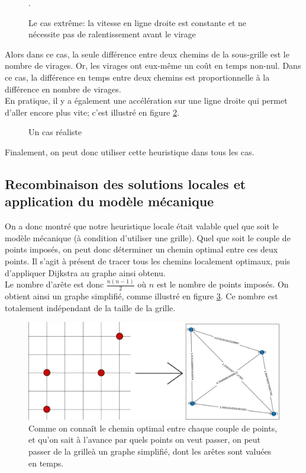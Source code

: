\begin{figure}
	\centering
	{\small }
	\caption{Le cas extrême: la vitesse en ligne droite est constante et ne nécessite pas de ralentissement avant le virage}.
	\label{fig:grille6}
\end{figure}
Alors dans ce cas, la seule différence entre deux chemins de la sous-grille est le nombre de virages. Or, les virages ont eux-même un coût en temps non-nul. Dans ce cas, la différence en temps entre deux chemins est proportionnelle à la différence en nombre de virages.\\
En pratique, il y a également une accélération sur une ligne droite qui permet d'aller encore plus vite; c'est illustré en figure \ref{fig:grille7}.
\begin{figure}
	\centering
	{\small	}
	\caption{Un cas réaliste}
	\label{fig:grille7}
\end{figure}
Finalement, on peut donc utiliser cette heuristique dans tous les cas.
\subsection{Recombinaison des solutions locales et application du modèle mécanique}
On a donc montré que notre heuristique locale était valable quel que soit le modèle mécanique (à condition d'utiliser une grille). Quel que soit le couple de  points imposés, on peut donc déterminer un chemin optimal entre ces deux points. Il s'agit à présent de tracer tous les chemins localement optimaux, puis d'appliquer Dijkstra au graphe ainsi obtenu.\\
Le nombre d'arête est donc $\frac{n(n-1)}{2}$ où $n$ est le nombre de points imposés. On obtient ainsi un graphe simplifié, comme illustré en figure \ref{fig:grapheSimp}. Ce nombre est totalement indépendant de la taille de la grille.
\begin{figure}
	\centering
	\includegraphics[width=\textwidth]{grapheSimp.png}
	\caption{Comme on connaît le chemin optimal entre chaque couple de points, et qu'on sait à l'avance par quels points on veut passer, on peut passer de la grilleà un graphe simplifié, dont les arêtes sont valuées en temps.}
	\label{fig:grapheSimp}
\end{figure}

